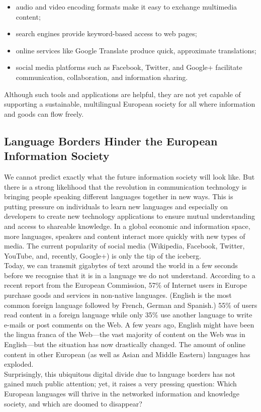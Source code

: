 \begin{multicols}{2}
\begin{itemize}
\item audio and video encoding formats make it easy to exchange multimedia content;

\item search engines provide keyword-based access to web pages;

\item online services like Google Translate produce quick, approximate translations;

\item social media platforms such as Facebook, Twitter, and Google+ facilitate
communication, collaboration, and information sharing.
\end{itemize}

Although such tools and applications are helpful, they are not yet capable of
supporting a sustainable, multilingual European society for all where
information and goods can flow freely.

\subsection{Language Borders Hinder the European Information Society}

We cannot predict exactly what the future information society will
look like.  But there is a strong likelihood that the revolution in
communication technology is bringing people speaking different
languages together in new ways. This is putting pressure on
individuals to learn new languages and especially on developers to
create new technology applications to ensure mutual understanding and
access to shareable knowledge. In a global economic and information
space, more languages, speakers and content interact more quickly with
new types of media. The current popularity of social media (Wikipedia,
Facebook, Twitter, YouTube, and, recently, Google+) is only the tip of
the iceberg.\\
Today, we can transmit gigabytes of text around the world in a few
seconds before we recognise that it is in a language we do not
understand. According to a recent report from the European Commission,
57\% of Internet users in Europe purchase goods and services in
non-native languages. (English is the most
common foreign language followed by French, German and Spanish.) 55\%
of users read content in a foreign language while only 35\% use
another language to write e-mails or post comments on the
Web. \cite{EC-prefer} 
A few years ago, English might have been the
lingua franca of the Web—the vast majority of content on the Web was
in English—but the situation has now drastically changed. The amount
of online content in other European (as well as Asian and Middle
Eastern) languages has exploded.\\
Surprisingly, this ubiquitous digital divide due to language borders
has not gained much public attention; yet, it raises a very pressing
question: Which European languages will thrive in the networked
information and knowledge society, and which are doomed to disappear?


\end{multicols}
